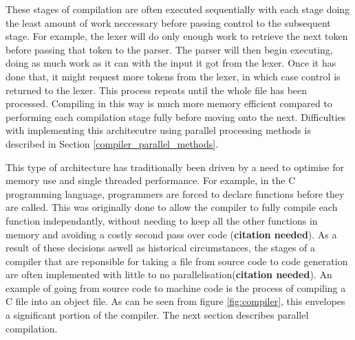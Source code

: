 These stages of compilation are often executed sequentially with each stage
doing the least amount of work neccessary before passing control to the
subsequent stage. For example, the lexer will do only enough work to retrieve
the next token before passing that token to the parser. The parser will then
begin executing, doing as much work as it can with the input it got from the
lexer. Once it has done that, it might request more tokens from the lexer,
in which case control is returned to the lexer. This process repeats until
the whole file has been processed. Compiling in this way is much more memory
efficient compared to performing each compilation stage fully before moving
onto the next. Difficulties with implementing this architecutre using parallel
processing methods is described in Section \ref{compiler_parallel_methods}.

This type of architecture has traditionally been driven by a need to
optimise for memory use and single threaded performance. For example, in
the C programming language, programmers are forced to declare functions
before they are called. This was originally done to allow the compiler
to fully compile each function independantly, without needing to keep all
the other functions in memory and avoiding a costly second pass over code
(\textbf{citation needed}). As a result of these decisions aswell as historical
circumstances, the stages of a compiler that are reponsible for taking a file
from source code to code generation are often implemented with little to no
parallelisation(\textbf{citation needed}). An example of going from source code
to machine code is the process of compiling a C file into an object file. As can
be seen from figure \ref{fig:compiler}, this envelopes a significant portion of
the compiler. The next section describes parallel compilation.

